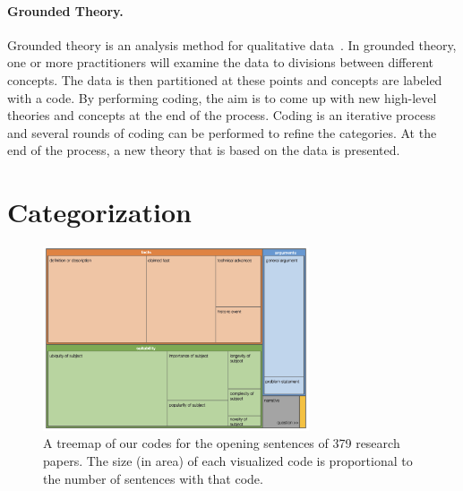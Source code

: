 \documentclass[sigconf]{acmart}
\newcommand{\etal}{\textit{et al.}\xspace}
\begin{document}

\paragraph{Grounded Theory.} Grounded theory is an analysis method for qualitative data~\cite{glaser1968discovery}. In grounded theory, one or more practitioners will examine the data to divisions between different concepts. The data is then partitioned at these points and concepts are labeled with a code. By performing coding, the aim is to come up with new high-level theories and concepts at the end of the process. Coding is an iterative process and several rounds of coding can be performed to refine the categories. At the end of the process, a new theory that is based on the data is presented. 


\section{Categorization}
\label{sec:categories}

	\begin{figure}[t]
	\centering
	\includegraphics[width=0.7\textwidth]{image.png}
	\caption{A treemap of our codes for the opening sentences of 379 research papers. The size (in area) of each visualized code is proportional to the number of sentences with that code.\label{fig:treemap}}
	\end{figure}
\end{document}
